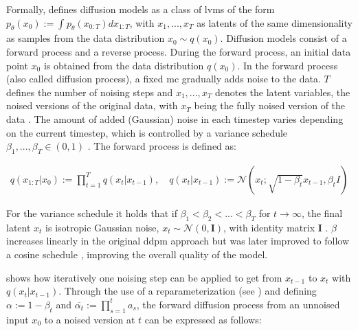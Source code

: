 Formally, \cite{ho2020DenoisingDiffusionProbabilistic} defines diffusion models as a class of \glspl{lvm} of the form $p_\theta(x_0):= \int_{}^{}p_\theta(x_{0:T})dx_{1:T}$,
with $x_1, ..., x_T$ as latents of the same dimensionality as samples from the data distribution $x_0 \sim q(x_0)$.
Diffusion models consist of a forward process and a reverse process.
During the forward process, an initial data point $x_0$ is obtained from the data distribution $q(x_0)$.
In the forward process (also called diffusion process), a fixed \gls{mc} gradually adds noise to the data.
$T$ defines the number of noising steps and $x_1,...,x_T$ denotes the latent variables, \ie the noised versions of the original data, with $x_T$ being the fully noised version of the data \cite{ho2020DenoisingDiffusionProbabilistic}.
The amount of added (Gaussian) noise in each timestep varies depending on the current timestep, which is controlled by a variance schedule $\beta_1, ..., \beta_T \in (0,1)$ \cite{ho2020DenoisingDiffusionProbabilistic}.
The forward process is defined as:

\begin{equation}
  \label{eqn:forwards_1}
  \begin{align*}
    q(x_{1:T} | x_0) := \prod_{t=1}^T q(x_t | x_{t-1}), \quad
    q(x_t | x_{t-1}) := \mathcal{N}(x_t; \sqrt{1 - \beta_t} x_{t-1}, \beta_t I)
  \end{align*}
\end{equation}

For the variance schedule it holds that if $\beta_1 < \beta_2 < ... < \beta_T$ for $t\rightarrow\infty$, the final latent $x_t$ is isotropic Gaussian noise, \ie $x_t \sim \mathcal{N}(0, \textbf{I})$, with identity matrix $\textbf{I}$ \cite{zbinden2022ImplementingExperimentingDiffusion}.
$\beta$ increases linearly in the original \gls{ddpm} approach \cite{ho2020DenoisingDiffusionProbabilistic} but was later improved to follow a cosine schedule \cite{nichol2021ImprovedDenoisingDiffusion}, improving the overall quality of the model.

 \cite{ho2020DenoisingDiffusionProbabilistic} shows how iteratively one noising step can be applied to get from $x_{t-1}$ to $x_t$ with $q(x_t | x_{t-1})$.
Through the use of a reparameterization (see ) and defining $\alpha := 1-\beta_t$ and $\overline{\alpha_t}:=\prod_{s=1}^{t}a_s$, 
the forward diffusion process from an unnoised input $x_0$ to a noised version at $t$ can be expressed as follows:

